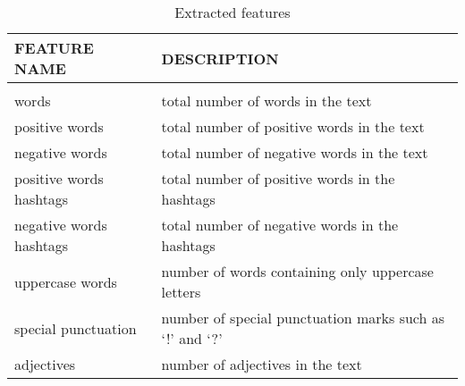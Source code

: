 \documentclass{article} %
\begin{document}
\begin{comment}
\begin{itemize}
\item \textbf{words} - total number of words in the text 
\item \textbf{positive words} - total number of positive words in the text
\item \textbf{negative words} - total number of negative words in the text 
\item \textbf{positive words hashtags} - total number of positive words in the hashtags 
\item \textbf{negative words hashtags} - total number of negative words in the hashtags 
\item \textbf{uppercase words} - number of words containing only uppercase letters 
\item \textbf{special punctuation} - number of special punctuation marks such as `!' and `?' 
\item \textbf{adjectives} - number of adjectives in the text  
\end{itemize}
\end{comment}

\begin{table}[h!]
\caption{Extracted features}
\label{featuretable}
\begin{center}
\begin{tabular}{ll}
\multicolumn{1}{l}{\bf FEATURE NAME}  &\multicolumn{1}{l}{\bf DESCRIPTION}
\\ \hline \\
words & total number of words in the text \\
positive words & total number of positive words in the text \\
negative words & total number of negative words in the text \\
positive words hashtags & total number of positive words in the hashtags \\
negative words hashtags & total number of negative words in the hashtags \\
uppercase words & number of words containing only uppercase letters \\
special punctuation & number of special punctuation marks such as `!' and `?' \\
adjectives & number of adjectives in the text 
\end{tabular}{}
\end{center}
\end{table}
\end{document}
